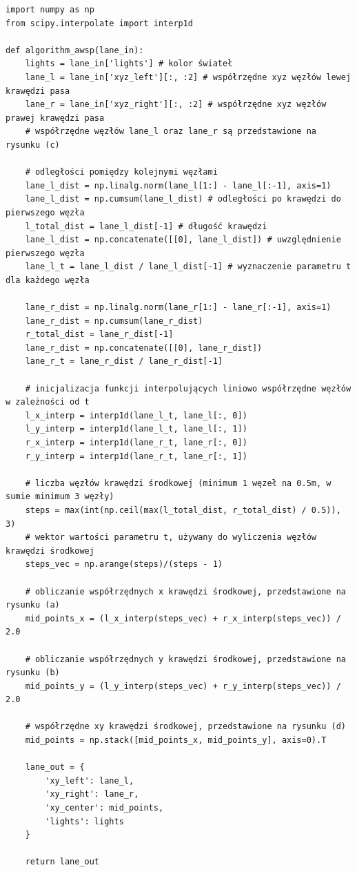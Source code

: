 \begin{verbatim}
import numpy as np
from scipy.interpolate import interp1d

def algorithm_awsp(lane_in):
    lights = lane_in['lights'] # kolor świateł
    lane_l = lane_in['xyz_left'][:, :2] # współrzędne xyz węzłów lewej krawędzi pasa
    lane_r = lane_in['xyz_right'][:, :2] # współrzędne xyz węzłów prawej krawędzi pasa
    # współrzędne węzłów lane_l oraz lane_r są przedstawione na rysunku (c)
    
    # odległości pomiędzy kolejnymi węzłami
    lane_l_dist = np.linalg.norm(lane_l[1:] - lane_l[:-1], axis=1)
    lane_l_dist = np.cumsum(lane_l_dist) # odległości po krawędzi do pierwszego węzła
    l_total_dist = lane_l_dist[-1] # długość krawędzi
    lane_l_dist = np.concatenate([[0], lane_l_dist]) # uwzględnienie pierwszego węzła
    lane_l_t = lane_l_dist / lane_l_dist[-1] # wyznaczenie parametru t dla każdego węzła

    lane_r_dist = np.linalg.norm(lane_r[1:] - lane_r[:-1], axis=1)
    lane_r_dist = np.cumsum(lane_r_dist)
    r_total_dist = lane_r_dist[-1]
    lane_r_dist = np.concatenate([[0], lane_r_dist])
    lane_r_t = lane_r_dist / lane_r_dist[-1]

    # inicjalizacja funkcji interpolujących liniowo współrzędne węzłów w zależności od t
    l_x_interp = interp1d(lane_l_t, lane_l[:, 0]) 
    l_y_interp = interp1d(lane_l_t, lane_l[:, 1])
    r_x_interp = interp1d(lane_r_t, lane_r[:, 0])
    r_y_interp = interp1d(lane_r_t, lane_r[:, 1])

    # liczba węzłów krawędzi środkowej (minimum 1 węzeł na 0.5m, w sumie minimum 3 węzły)
    steps = max(int(np.ceil(max(l_total_dist, r_total_dist) / 0.5)), 3)
    # wektor wartości parametru t, używany do wyliczenia węzłów krawędzi środkowej
    steps_vec = np.arange(steps)/(steps - 1)

    # obliczanie współrzędnych x krawędzi środkowej, przedstawione na rysunku (a)
    mid_points_x = (l_x_interp(steps_vec) + r_x_interp(steps_vec)) / 2.0
    
    # obliczanie współrzędnych y krawędzi środkowej, przedstawione na rysunku (b)
    mid_points_y = (l_y_interp(steps_vec) + r_y_interp(steps_vec)) / 2.0
    
    # współrzędne xy krawędzi środkowej, przedstawione na rysunku (d)
    mid_points = np.stack([mid_points_x, mid_points_y], axis=0).T

    lane_out = {
        'xy_left': lane_l,
        'xy_right': lane_r,
        'xy_center': mid_points,
        'lights': lights
    }

    return lane_out
\end{verbatim}


